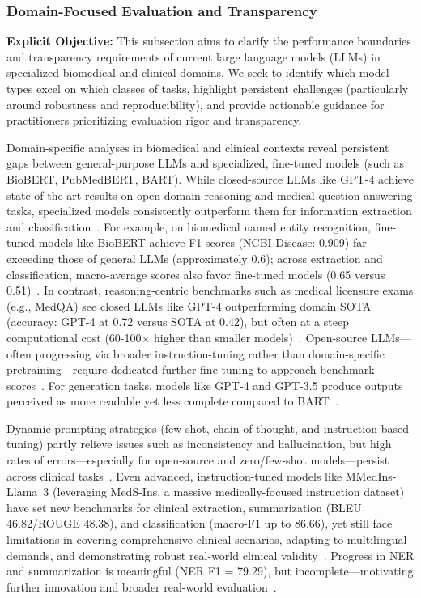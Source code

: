 \documentclass[sigconf]{acmart}
\begin{document}
\subsubsection{Domain-Focused Evaluation and Transparency}

\textbf{Explicit Objective:} This subsection aims to clarify the performance boundaries and transparency requirements of current large language models (LLMs) in specialized biomedical and clinical domains. We seek to identify which model types excel on which classes of tasks, highlight persistent challenges (particularly around robustness and reproducibility), and provide actionable guidance for practitioners prioritizing evaluation rigor and transparency.

Domain-specific analyses in biomedical and clinical contexts reveal persistent gaps between general-purpose LLMs and specialized, fine-tuned models (such as BioBERT, PubMedBERT, BART). While closed-source LLMs like GPT-4 achieve state-of-the-art results on open-domain reasoning and medical question-answering tasks, specialized models consistently outperform them for information extraction and classification~\cite{ref94,ref95}. For example, on biomedical named entity recognition, fine-tuned models like BioBERT achieve F1 scores (NCBI Disease: 0.909) far exceeding those of general LLMs (approximately 0.6); across extraction and classification, macro-average scores also favor fine-tuned models (0.65 versus 0.51)~\cite{ref94}. In contrast, reasoning-centric benchmarks such as medical licensure exams (e.g., MedQA) see closed LLMs like GPT-4 outperforming domain SOTA (accuracy: GPT-4 at 0.72 versus SOTA at 0.42), but often at a steep computational cost (60-100$\times$ higher than smaller models)~\cite{ref94}. Open-source LLMs—often progressing via broader instruction-tuning rather than domain-specific pretraining—require dedicated further fine-tuning to approach benchmark scores~\cite{ref94}. For generation tasks, models like GPT-4 and GPT-3.5 produce outputs perceived as more readable yet less complete compared to BART~\cite{ref94}.

Dynamic prompting strategies (few-shot, chain-of-thought, and instruction-based tuning) partly relieve issues such as inconsistency and hallucination, but high rates of errors—especially for open-source and zero/few-shot models—persist across clinical tasks~\cite{ref94}. Even advanced, instruction-tuned models like MMedIns-Llama~3 (leveraging MedS-Ins, a massive medically-focused instruction dataset) have set new benchmarks for clinical extraction, summarization (BLEU 46.82/ROUGE 48.38), and classification (macro-F1 up to 86.66), yet still face limitations in covering comprehensive clinical scenarios, adapting to multilingual demands, and demonstrating robust real-world clinical validity~\cite{ref95}. Progress in NER and summarization is meaningful (NER F1 = 79.29), but incomplete—motivating further innovation and broader real-world evaluation~\cite{ref95}.
\end{document}
